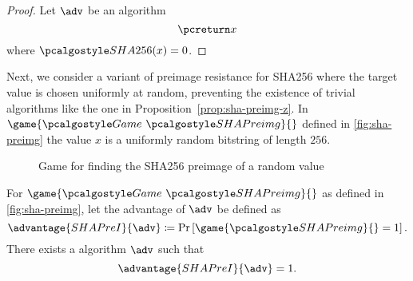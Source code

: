 \begin{proof}
  Let $\adv$ be an algorithm
  \[
   \pcreturn x
  \]
  where $\algo{SHA256}(x) = 0$.
\end{proof}

Next, we consider a variant of preimage resistance for SHA256 where the target value is chosen uniformly at random, preventing the existence of trivial algorithms like the one in Proposition~\ref{prop:sha-preimg-z}.
In $\game{\Game~\algo{SHAPreimg}}{}$ defined in \autoref{fig:sha-preimg} the value $x$ is a uniformly random bitstring of length $256$.

\begin{figure}[tbhp]
  \begin{center}
    \begin{tcolorbox}[width=5cm]
      \begin{pchstack}[center]
      \end{pchstack}
    \end{tcolorbox}
  \end{center}
  \caption{Game for finding the SHA256 preimage of a random value \label{fig:sha-preimg}}
\end{figure}

\begin{proposition}
 For $\game{\Game~\algo{SHAPreimg}}{}$ as defined in \autoref{fig:sha-preimg}, let the advantage of $\adv$ be defined as
 \[
  \advantage{SHAPreI}{\adv} \defeq \pr{\game{\algo{SHAPreimg}}{} = 1}.
 \]
 There exists a \ppt algorithm $\adv$ such that
 \[
 \advantage{SHAPreI}{\adv} = 1.
 \]
\end{proposition}

